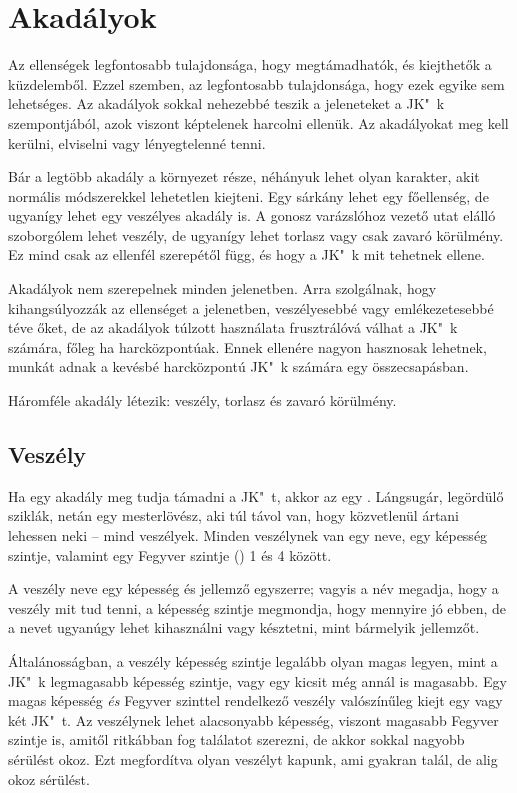 \section{Akadályok}

Az ellenségek legfontosabb tulajdonsága, hogy megtámadhatók, és kiejthetők a küzdelemből. Ezzel szemben, az  legfontosabb tulajdonsága, hogy ezek egyike sem lehetséges. Az akadályok sokkal nehezebbé teszik a jeleneteket a JK"~k szempontjából, azok viszont képtelenek harcolni ellenük. Az akadályokat meg kell kerülni, elviselni vagy lényegtelenné tenni.

Bár a legtöbb akadály a környezet része, néhányuk lehet olyan karakter, akit normális módszerekkel lehetetlen kiejteni. Egy sárkány lehet egy főellenség, de ugyanígy lehet egy veszélyes akadály is. A gonosz varázslóhoz vezető utat elálló szoborgólem lehet veszély, de ugyanígy lehet torlasz vagy csak zavaró körülmény. Ez mind csak az ellenfél szerepétől függ, és hogy a JK"~k mit tehetnek ellene.

Akadályok nem szerepelnek minden jelenetben. Arra szolgálnak, hogy kihangsúlyozzák az ellenséget a jelenetben, veszélyesebbé vagy emlékezetesebbé téve őket, de az akadályok túlzott használata frusztrálóvá válhat a JK"~k számára, főleg ha harcközpontúak. Ennek ellenére nagyon hasznosak lehetnek, munkát adnak a kevésbé harcközpontú JK"~k számára egy összecsapásban.

Háromféle akadály létezik: veszély, torlasz és zavaró körülmény.

\subsection{Veszély}

Ha egy akadály meg tudja támadni a JK"~t, akkor az egy . Lángsugár, legördülő sziklák, netán egy mesterlövész, aki túl távol van, hogy közvetlenül ártani lehessen neki -- mind veszélyek. Minden veszélynek van egy neve, egy képesség szintje, valamint egy Fegyver szintje () 1 és 4 között.

A veszély neve egy képesség és jellemző egyszerre; vagyis a név megadja, hogy a veszély mit tud tenni, a képesség szintje megmondja, hogy mennyire jó ebben, de a nevet ugyanúgy lehet kihasználni vagy késztetni, mint bármelyik jellemzőt.

Általánosságban, a veszély képesség szintje legalább olyan magas legyen, mint a JK"~k legmagasabb képesség szintje, vagy egy kicsit még annál is magasabb. Egy magas képesség \emph{és} Fegyver szinttel rendelkező veszély valószínűleg kiejt egy vagy két JK"~t. Az veszélynek lehet alacsonyabb képesség, viszont magasabb Fegyver szintje is, amitől ritkábban fog találatot szerezni, de akkor sokkal nagyobb sérülést okoz. Ezt megfordítva olyan veszélyt kapunk, ami gyakran talál, de alig okoz sérülést.

